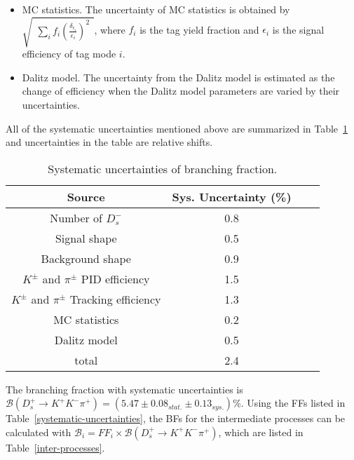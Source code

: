 {\begin{itemize}
    \item MC statistics. The uncertainty of MC statistics is obtained by $\sqrt{ \begin{matrix} \sum_{i} f_{i}{\left(\frac{\delta_{\epsilon_{i}}}{\epsilon_{i}}\right)}^{2}\end{matrix}}$, where $f_{i}$ is the tag yield fraction and $\epsilon_{i}$ is the signal efficiency of tag mode $i$.
        \item Dalitz model. The uncertainty from the Dalitz model is estimated as the change of efficiency when the Dalitz model parameters are varied by their uncertainties.
    \end{itemize}

    All of the systematic uncertainties mentioned above are summarized in Table~\ref{BF-Sys} and uncertainties in the table are relative shifts.
    \begin{table}[htbp]
        \caption{Systematic uncertainties of branching fraction.}
        \label{BF-Sys}
        \begin{center}
            \begin{tabular}{cccc}
                \toprule\toprule
                Source   & Sys. Uncertainty (\%)\\
                \hline
                Number of $D_{s}^{-}$               & 0.8 \\
                Signal shape                        & 0.5 \\
                Background shape      & 0.9 \\
                $K^{\pm}$ and $\pi^{\pm}$ PID efficiency            & 1.5 \\
                $K^{\pm}$ and $\pi^{\pm}$ Tracking efficiency       & 1.3 \\
                MC statistics                       & 0.2 \\
                \hline
                Dalitz model                               & 0.5 \\
                \hline
                total                               & 2.4 \\
                \bottomrule\bottomrule
            \end{tabular}
        \end{center}
    \end{table}

    The branching fraction with systematic uncertainties is $\mathcal{B}(D_{s}^{+} \rightarrow K^{+}K^{-}\pi^{+})=(5.47\pm0.08_{stat.}\pm0.13_{sys.})\%$.
    Using the FFs listed in Table~\ref{systematic-uncertainties}, the BFs for the intermediate processes can be calculated with $\mathcal{B}_{i} = FF_{i} \times \mathcal{B}(D_{s}^{+} \rightarrow K^{+}K^{-}\pi^{+})$, which are listed in Table~\ref{inter-processes}.  
    
}
